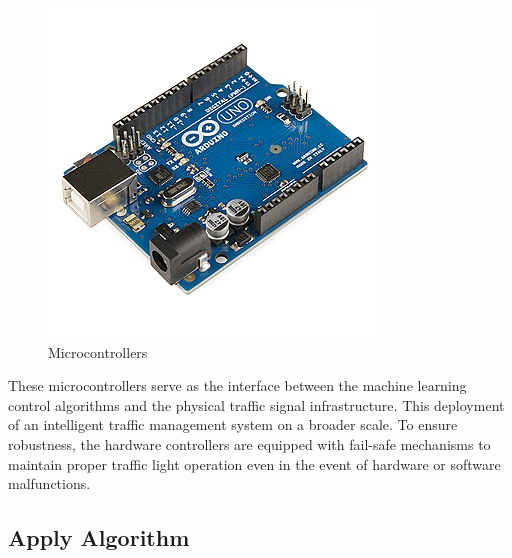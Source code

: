 \documentclass[conference]{IEEEtran}
\begin{document}
\begin{figure}[H]
\begin{minipage}[b]{0.16\textwidth}
    \end{minipage}
    \hspace{0.01\textwidth}
    \begin{minipage}[b]{0.16\textwidth}
        \centering
        \includegraphics[width=\textwidth]{5.jpg}
    \end{minipage}
    \caption{Microcontrollers}
    \label{fig:f4}
\end{figure}
These microcontrollers serve as the interface between the machine learning control algorithms and the physical traffic signal infrastructure. This deployment of an intelligent traffic management system on a broader scale. To ensure robustness, the hardware controllers are equipped with fail-safe mechanisms to maintain proper traffic light operation even in the event of hardware or software malfunctions.


\subsection{Apply Algorithm}
\end{document}
